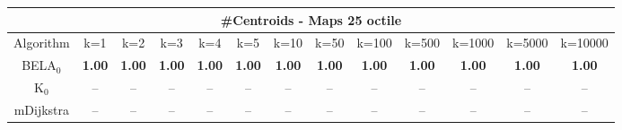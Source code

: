 \begin{tabular}{c|cccccccccccc}\toprule
\multicolumn{13}{c}{#Centroids - Maps 25 octile}\\ \midrule
Algorithm & k=1 & k=2 & k=3 & k=4 & k=5 & k=10 & k=50 & k=100 & k=500 & k=1000 & k=5000 & k=10000 \\ \midrule
BELA$_0$ & \textbf{1.00} & \textbf{1.00} & \textbf{1.00} & \textbf{1.00} & \textbf{1.00} & \textbf{1.00} & \textbf{1.00} & \textbf{1.00} & \textbf{1.00} & \textbf{1.00} & \textbf{1.00} & \textbf{1.00} \\
K$_0$ & -- & -- & -- & -- & -- & -- & -- & -- & -- & -- & -- & -- \\
mDijkstra & -- & -- & -- & -- & -- & -- & -- & -- & -- & -- & -- & -- \\ \bottomrule 
\end{tabular}
